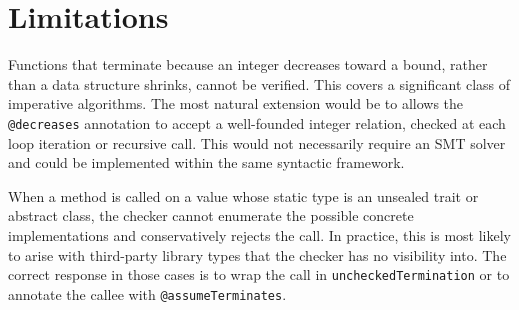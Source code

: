 \section{Limitations}
Functions that terminate because an integer decreases toward a bound, rather
than a data structure shrinks, cannot be verified. This covers a significant
class of imperative algorithms. The most natural extension would be to allows
the \texttt{@decreases} annotation to accept a well-founded integer relation,
checked at each loop iteration or recursive call. This would not necessarily
require an SMT solver and could be implemented within the same syntactic
framework.

When a method is called on a value whose static type is an unsealed trait or
abstract class, the checker cannot enumerate the possible concrete
implementations and conservatively rejects the call. In practice, this is most
likely to arise with third-party library types that the checker has no
visibility into. The correct response in those cases is to wrap the call in
\texttt{uncheckedTermination} or to annotate the callee with
\texttt{@assumeTerminates}.

